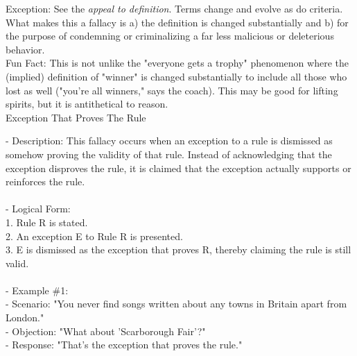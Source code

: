 \documentclass[a4paper,12pt,single,pdftex]{scrartcl}
\begin{document}
    
      Exception: See the {\it appeal to definition}. Terms change and evolve as do criteria. What makes this a fallacy is a) the definition is changed substantially and b) for the purpose of condemning or criminalizing a far less malicious or deleterious behavior. 
    \\

    
      Fun Fact: This is not unlike the "everyone gets a trophy" phenomenon where the (implied) definition of "winner" is changed substantially to include all those who lost as well ("you're all winners," says the coach). This may be good for lifting spirits, but it is antithetical to reason.
    \\

  

 Exception That Proves The Rule
    
      - Description: This fallacy occurs when an exception to a rule is dismissed as somehow proving the validity of that rule. Instead of acknowledging that the exception disproves the rule, it is claimed that the exception actually supports or reinforces the rule.
    \\

    
      
    \\

    
      - Logical Form:
    \\

    
        1. Rule R is stated.
    \\

    
        2. An exception E to Rule R is presented.
    \\

    
        3. E is dismissed as the exception that proves R, thereby claiming the rule is still valid.
    \\

    
      
    \\

    
      - Example \#1:
    \\

    
        - Scenario: "You never find songs written about any towns in Britain apart from London."
    \\

    
        - Objection: "What about 'Scarborough Fair'?"
    \\

    
        - Response: "That’s the exception that proves the rule."
    \\
\end{document}
